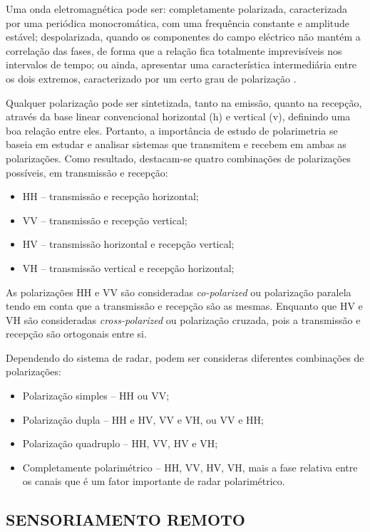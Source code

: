 \documentclass[a4paper,12pt]{article}
\begin{document}
Uma onda eletromagnética pode ser: completamente polarizada, caracterizada por uma periódica monocromática, com uma frequência constante e amplitude estável; despolarizada, quando os componentes do campo eléctrico não mantém a correlação das fases, de forma que a relação fica totalmente imprevisíveis nos intervalos de tempo; ou ainda, apresentar uma característica intermediária entre os dois extremos, caracterizado por um certo grau de polarização \cite{nilosergio2012}.

Qualquer polarização pode ser sintetizada, tanto na emissão, quanto na recepção, através da base linear convencional horizontal (h) e vertical (v), definindo uma boa relação entre eles. Portanto, a importância de estudo de polarimetria se baseia em estudar e analisar sistemas que transmitem e recebem em ambas as polarizações. Como resultado, destacam-se quatro combinações de polarizações possíveis, em transmissão e recepção:

\begin{itemize}
    \item HH – transmissão e recepção horizontal;
    \item VV – transmissão e recepção vertical;
    \item HV – transmissão horizontal e recepção vertical;
    \item VH – transmissão vertical e recepção horizontal;
\end{itemize}

As polarizações HH e VV são consideradas \textit{co-polarized} ou polarização paralela tendo em conta que a transmissão e recepção são as mesmas. Enquanto que HV e VH são consideradas \textit{cross-polarized} ou polarização cruzada, pois a transmissão e recepção são ortogonais entre si.

Dependendo do sistema de radar, podem ser consideras diferentes combinações de polarizações:

\begin{itemize}
    \item Polarização simples – HH ou VV;
    \item Polarização dupla – HH e HV, VV e VH, ou VV e HH;
    \item Polarização quadruplo  – HH, VV, HV e VH;
    \item Completamente polarimétrico –  HH, VV, HV, VH, mais a fase relativa entre os canais que é um fator importante de radar polarimétrico.
\end{itemize}

\subsection{SENSORIAMENTO REMOTO}
\label{subsec:SR}
\end{document}
